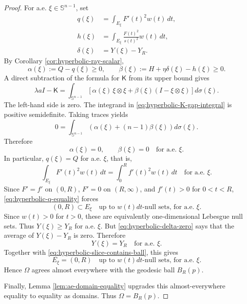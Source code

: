 \documentclass[11pt]{amsart}
\theoremstyle{remark}
\newcommand{\Sn}{\mathbb S}
\newcommand{\Id}{I}
\newcommand{\mcK}{\mathsf K}
\begin{document}
\begin{proof}
For a.e. $\xi\in\Sn^{n-1}$, set
\begin{align*}
        q(\xi)&=\int_{E_\xi}F'(t)^2w(t)\,dt,\\
        h(\xi)&=\int_{E_\xi}\frac{F(t)^2}{s(t)^2}w(t)\,dt,\\
        \delta(\xi)&=Y(\xi)-Y_R.
\end{align*}
By Corollary \ref{cor:hyperbolic-ray-scalar},
$$
        \alpha(\xi):=Q-q(\xi)\ge0,
        \qquad
        \beta(\xi):=H+\eta\delta(\xi)-h(\xi)\ge0.
$$
A direct subtraction of the formula for $\mcK$ from its upper bound gives
\begin{equation}\label{eq:hyperbolic-K-gap-integral}
        \lambda a\Id-\mcK
        =\int_{\Sn^{n-1}}
        \left[\alpha(\xi)\,\xi\otimes\xi+\beta(\xi)(\Id-\xi\otimes\xi)\right]d\sigma(\xi).
\end{equation}
The left-hand side is zero.  The integrand in \eqref{eq:hyperbolic-K-gap-integral} is positive semidefinite.  Taking traces yields
$$
        0=\int_{\Sn^{n-1}}\left(\alpha(\xi)+(n-1)\beta(\xi)\right)d\sigma(\xi).
$$
Therefore
\begin{equation}\label{eq:hyperbolic-alpha-beta-zero}
        \alpha(\xi)=0,
        \qquad
        \beta(\xi)=0
        \quad\text{for a.e. }\xi.
\end{equation}
In particular, $q(\xi)=Q$ for a.e. $\xi$, that is,
\begin{equation}\label{eq:hyperbolic-q-equality}
        \int_{E_\xi}F'(t)^2w(t)\,dt
        =\int_0^R f'(t)^2w(t)\,dt
        \quad\text{for a.e. }\xi.
\end{equation}
Since $F'=f'$ on $(0,R)$, $F'=0$ on $(R,\infty)$, and $f'(t)>0$ for $0<t<R$, \eqref{eq:hyperbolic-q-equality} forces
\begin{equation}\label{eq:hyperbolic-slice-contains-ball}
        (0,R)\subset E_\xi
        \quad\text{up to }w(t)dt\text{-null sets, for a.e. }\xi.
\end{equation}
Since $w(t)>0$ for $t>0$, these are equivalently one-dimensional Lebesgue null sets.  Thus $Y(\xi)\ge Y_R$ for a.e. $\xi$.  But \eqref{eq:hyperbolic-delta-zero} says that the average of $Y(\xi)-Y_R$ is zero.  Therefore
$$
        Y(\xi)=Y_R
        \quad\text{for a.e. }\xi.
$$
Together with \eqref{eq:hyperbolic-slice-contains-ball}, this gives
$$
        E_\xi=(0,R)
        \quad\text{up to }w(t)dt\text{-null sets, for a.e. }\xi.
$$
Hence $\Omega$ agrees almost everywhere with the geodesic ball $B_R(p)$.

Finally, Lemma \ref{lem:ae-domain-equality} upgrades this almost-everywhere equality to equality as domains.  Thus $\Omega=B_R(p)$.
\end{proof}
\end{document}
